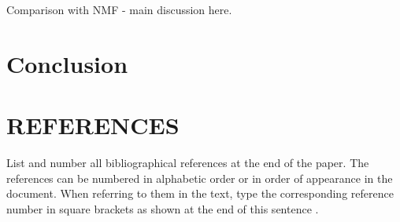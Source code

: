 \documentclass{article}
\begin{document}
Comparison with NMF - main discussion here.

\section{Conclusion}
\label{sec:conclusion}



\vfill
\pagebreak



\section{REFERENCES}
\label{sec:ref}

List and number all bibliographical references at the end of the paper.  The references can be numbered in alphabetic order or in order of appearance in the document.  When referring to them in the text, type the corresponding reference number in square brackets as shown at the end of this sentence .



\end{document}
